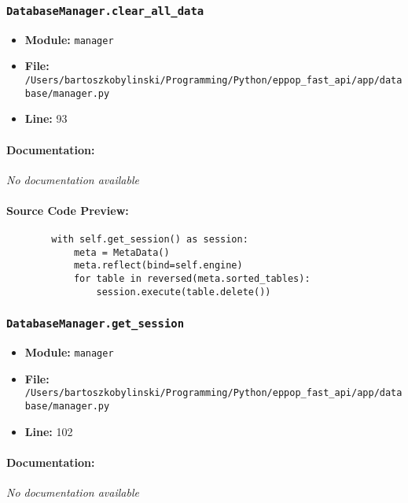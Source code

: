 \documentclass[11pt,a4paper]{article}
\begin{document}
\vspace{1em}
\subsubsection{\texttt{DatabaseManager.clear\_all\_data}}

\begin{itemize}
    \item \textbf{Module:} \texttt{manager}
    \item \textbf{File:} \texttt{/Users/bartoszkobylinski/Programming/Python/eppop\_fast\_api/app/database/manager.py}
    \item \textbf{Line:} 93
\end{itemize}

\paragraph{Documentation:} \textit{No documentation available}

\paragraph{Source Code Preview:}
\begin{verbatim}
        with self.get_session() as session:
            meta = MetaData()
            meta.reflect(bind=self.engine)
            for table in reversed(meta.sorted_tables):
                session.execute(table.delete())
\end{verbatim}

\vspace{1em}
\subsubsection{\texttt{DatabaseManager.get\_session}}

\begin{itemize}
    \item \textbf{Module:} \texttt{manager}
    \item \textbf{File:} \texttt{/Users/bartoszkobylinski/Programming/Python/eppop\_fast\_api/app/database/manager.py}
    \item \textbf{Line:} 102
\end{itemize}

\paragraph{Documentation:} \textit{No documentation available}
\end{document}
